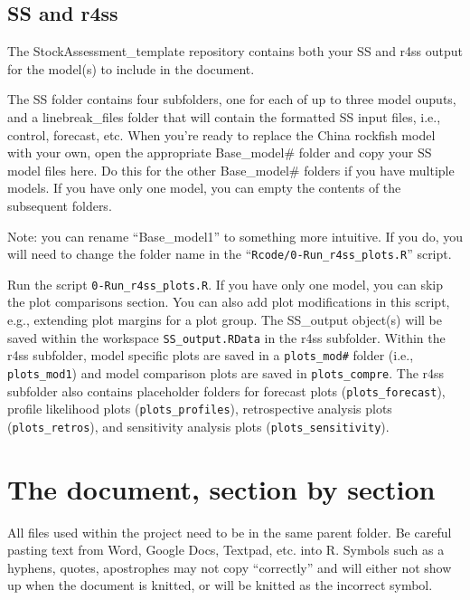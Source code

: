 \documentclass[12pt,]{article}
\begin{document}
\subsection{SS and r4ss}\label{ss-and-r4ss}

The StockAssessment\_template repository contains both your SS and r4ss
output for the model(s) to include in the document.

The SS folder contains four subfolders, one for each of up to three
model ouputs, and a linebreak\_files folder that will contain the
formatted SS input files, i.e., control, forecast, etc. When you're
ready to replace the China rockfish model with your own, open the
appropriate Base\_model\# folder and copy your SS model files here. Do
this for the other Base\_model\# folders if you have multiple models. If
you have only one model, you can empty the contents of the subsequent
folders.

Note: you can rename ``Base\_model1'' to something more intuitive. If
you do, you will need to change the folder name in the
``\texttt{Rcode/0-Run\_r4ss\_plots.R}'' script.

Run the script \texttt{0-Run\_r4ss\_plots.R}. If you have only one
model, you can skip the plot comparisons section. You can also add plot
modifications in this script, e.g., extending plot margins for a plot
group. The SS\_output object(s) will be saved within the workspace
\texttt{SS\_output.RData} in the r4ss subfolder. Within the r4ss
subfolder, model specific plots are saved in a \texttt{plots\_mod\#}
folder (i.e., \texttt{plots\_mod1}) and model comparison plots are saved
in \texttt{plots\_compre}. The r4ss subfolder also contains placeholder
folders for forecast plots (\texttt{plots\_forecast}), profile
likelihood plots (\texttt{plots\_profiles}), retrospective analysis
plots (\texttt{plots\_retros}), and sensitivity analysis plots
(\texttt{plots\_sensitivity}).

\section{The document, section by
section}\label{the-document-section-by-section}

All files used within the project need to be in the same parent folder.
Be careful pasting text from Word, Google Docs, Textpad, etc. into R.
Symbols such as a hyphens, quotes, apostrophes may not copy
``correctly'' and will either not show up when the document is knitted,
or will be knitted as the incorrect symbol.
\end{document}
